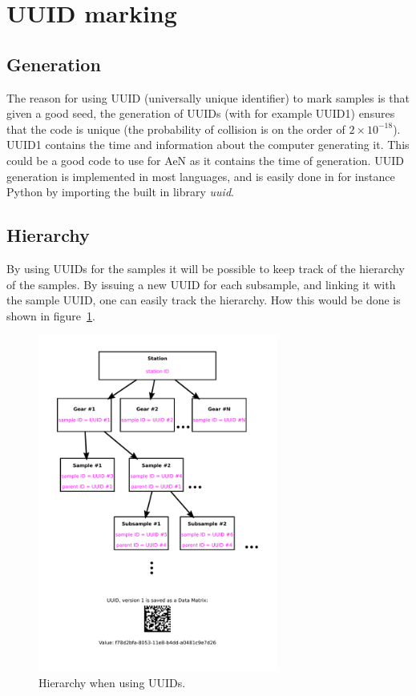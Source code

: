 \documentclass[a4paper,english, 11pt]{article}
\begin{document}
\section{UUID marking} %
\label{sec:UUID}

\subsection{Generation} %
\label{sub:Generation}

The reason for using UUID (universally unique identifier) to mark samples is that given a good seed, the generation of UUIDs (with for example UUID1) ensures that the code is unique (the probability of collision is on the order of $ 2\times10^{-18}$). UUID1 contains the time and information about the computer generating it. This could be a good code to use for AeN as it contains the time of generation. UUID generation is implemented in most languages, and is easily done in for instance Python by importing the built in library \emph{uuid}. 


\subsection{Hierarchy} %
\label{sub:Hirarcy}

By using UUIDs for the samples it will be possible to keep track of the hierarchy of the samples. By issuing a new UUID for each subsample, and linking it with the sample UUID, one can easily track the hierarchy. How this would be done is shown in figure~\ref{fig:parent_uuid}.
\begin{figure}[htb]
    \centering
    \includegraphics[width=0.7\textwidth]{UUID.pdf}
    \caption{\label{fig:parent_uuid}
       Hierarchy when using UUIDs. 
    }
\end{figure}
\end{document}
